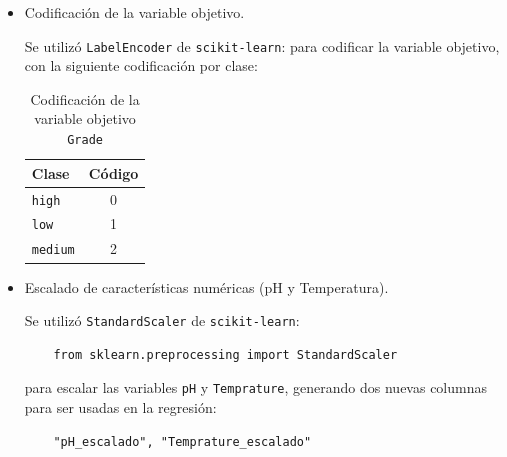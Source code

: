 \documentclass[12pt,a4paper]{article}
\begin{document}
\begin{itemize}
    \item[$\scalebox{0.7}{$\blacksquare$}$] Codificación de la variable objetivo.

	Se utilizó \texttt{LabelEncoder} de \texttt{scikit-learn}:
	para codificar la variable objetivo, con la siguiente codificación por clase:
	
	\begin{table}[h!]
	\centering
	\begin{tabular}{lc}
	\hline
	\textbf{Clase} & \textbf{Código} \\
	\hline
	\texttt{high}   & 0 \\
	\texttt{low}    & 1 \\
	\texttt{medium} & 2 \\
	\hline
	\end{tabular}
	\caption{Codificación de la variable objetivo \texttt{Grade}}
	\end{table}

    \item[$\scalebox{0.7}{$\blacksquare$}$] Escalado de características numéricas (pH y Temperatura).

	Se utilizó \texttt{StandardScaler} de \texttt{scikit-learn}:

	\begin{verbatim}
	from sklearn.preprocessing import StandardScaler
	\end{verbatim}
	
	para escalar las variables \texttt{pH} y \texttt{Temprature}, generando dos nuevas columnas para ser usadas en la regresión:
	
	\begin{verbatim}
	"pH_escalado", "Temprature_escalado"
	\end{verbatim}
\end{itemize}
	
\end{document}
